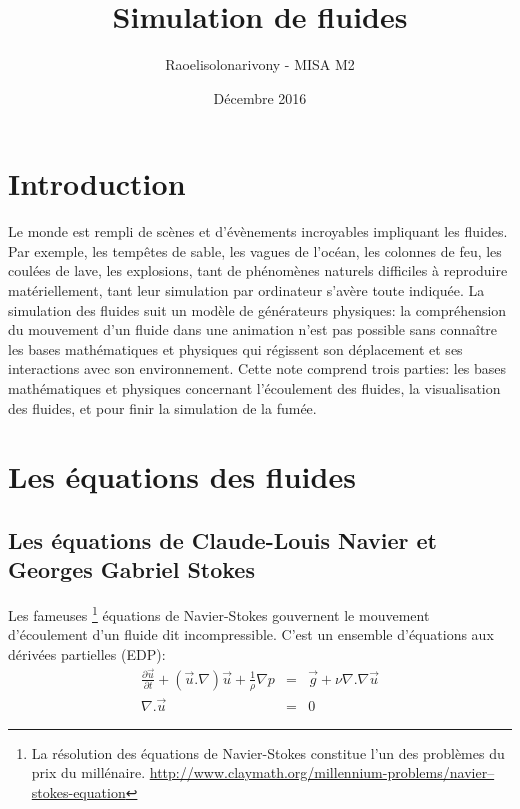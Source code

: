 \documentclass[11pt]{article}
\title{Simulation de fluides}
\author{Raoelisolonarivony - MISA M2}
\date{Décembre 2016}
\begin{document}
\maketitle

\section{Introduction}

Le monde est rempli de scènes et d’évènements incroyables impliquant les fluides. Par exemple, les tempêtes de sable, les vagues de l'océan, les colonnes de feu, les coulées de lave, les explosions, tant de phénomènes naturels difficiles à reproduire matériellement, tant leur simulation par ordinateur s'avère toute indiquée. La simulation des fluides suit un modèle de générateurs physiques: la compréhension du mouvement d'un fluide dans une animation n'est pas possible sans connaître les bases mathématiques et physiques qui régissent son déplacement et ses interactions avec son environnement. Cette note comprend trois parties: les bases mathématiques et physiques concernant l'écoulement des fluides, la visualisation des fluides,  et pour finir la simulation de la fumée.

\section{Les équations des fluides}

\subsection{Les équations de Claude-Louis Navier et Georges Gabriel Stokes}

Les fameuses
\footnote{La résolution des équations de Navier-Stokes constitue l'un des problèmes du prix du millénaire. \url{http://www.claymath.org/millennium-problems/navier–stokes-equation}}
équations de Navier-Stokes gouvernent le mouvement d'écoulement d'un fluide dit incompressible. C'est un ensemble d'équations aux dérivées partielles (EDP):
	\begin{eqnarray}\label{equation/navier-stokes-1}
	\frac{\partial \overrightarrow{u}}{\partial t} + (\overrightarrow{u} . \nabla ) \overrightarrow{u} + \frac{1}{\rho} \nabla p & = & \overrightarrow{g} + \nu \nabla . \nabla \overrightarrow{u} \\
	\label{equation/navier-stokes-2}
\nabla . \overrightarrow{u} & = & 0
	\end{eqnarray}
\end{document}
